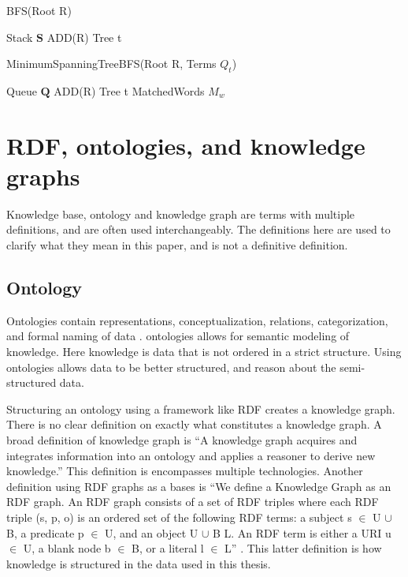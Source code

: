 \begin{algorithm}[H]
    \caption{BFS(Root R)}
    \label{DFS}
    \SetAlgoLined
    Stack $\mathbf{S}$ ADD(R)\; Tree t \;
\end{algorithm}

\begin{algorithm}[H]
    \caption{MinimumSpanningTreeBFS(Root R, Terms $Q_t$)}
    \label{MinTreeBFS}
    \SetAlgoLined
    Queue $\mathbf{Q}$ ADD(R)\; Tree t \; MatchedWords $M_w$ \;
\end{algorithm}


\section{RDF, ontologies, and knowledge graphs}
Knowledge base, ontology and knowledge graph are terms with multiple definitions, and are often used interchangeably. The definitions here are used to clarify what they mean in this paper, and is not a definitive definition.

\subsection{Ontology}
Ontologies contain representations, conceptualization, relations, categorization, and formal naming of data \cite{davies2006semantic}. ontologies allows for semantic modeling of knowledge. Here knowledge is data that is not ordered in a strict structure. Using ontologies allows data to be better structured, and reason about the semi-structured data.

Structuring an ontology using a framework like RDF creates a knowledge graph. There is no clear definition on exactly what constitutes a knowledge graph. A broad definition of knowledge graph is ``A knowledge graph acquires and integrates information into an ontology and applies a reasoner to derive new knowledge.'' \citep{KGDef} This definition is encompasses multiple technologies. Another definition using RDF graphs as a bases is ``We define a Knowledge Graph as an RDF graph. An RDF graph consists of a set of RDF triples where each RDF triple (s, p, o) is an ordered set of the following RDF terms: a subject s $\in$ U $\cup$ B, a predicate p $\in$ U, and an object U $\cup$ B  L. An RDF term is either a URI u $\in$ U, a blank node b $\in$ B, or a literal l $\in$ L'' \citep{KGDefYago}. This latter definition is how knowledge is structured in the data used in this thesis.

